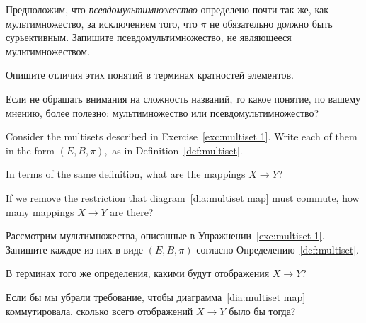 \documentclass[../main/CT4S-EN-RU]{subfiles}
\begin{document}
\begin{exerciseRUS}
Предположим, что {\em псевдомультимножество} определено почти так же, как мультимножество, за исключением того, что $\pi$ не обязательно должно быть сурьективным. 
\sexc Запишите псевдомультимножество, не являющееся мультимножеством. 
\item Опишите отличия этих понятий в терминах кратностей элементов. 
\item Если не обращать внимания на сложность названий, то какое понятие, по вашему мнению, более полезно: мультимножество или псевдомультимножество? 
\endsexc
\end{exerciseRUS}

\begin{exerciseENG}
Consider the multisets described in Exercise~\ref{exc:multiset 1}. 
\sexc Write each of them in the form $(E,B,\pi),$ as in Definition~\ref{def:multiset}. 
\item In terms of the same definition, what are the mappings $X{→} Y?$ 
\item If we remove the restriction that diagram~\ref{dia:multiset map} must commute, how many mappings $X{→} Y$ are there?
\endsexc
\end{exerciseENG}

\begin{exerciseRUS}
Рассмотрим мультимножества, описанные в Упражнении~\ref{exc:multiset 1}. 
\sexc Запишите каждое из них в виде $(E,B,\pi)$ согласно Определению~\ref{def:multiset}. 
\item В терминах того же определения, какими будут отображения $X{→} Y?$ 
\item Если бы мы убрали требование, чтобы диаграмма~\ref{dia:multiset map} коммутировала, сколько всего отображений $X{→} Y$ было бы тогда?
\endsexc
\end{exerciseRUS}
\end{document}
